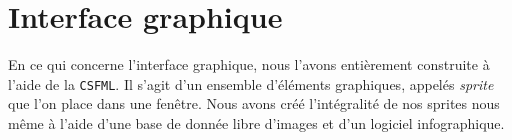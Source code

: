 \section*{Interface graphique}

	En ce qui concerne l'interface graphique, nous l'avons entièrement construite à l'aide de la \texttt{CSFML}. Il s'agit d'un ensemble d'éléments graphiques, appelés \textit{sprite} que l'on place dans une fenêtre. Nous avons créé l'intégralité de nos sprites nous même à l'aide d'une base de donnée libre d'images et d'un logiciel infographique. 
\vspace{0.5cm}

\vspace{0.5cm}


